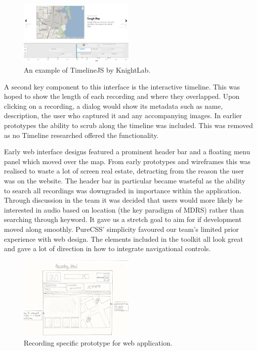 \documentclass{l3proj}
\begin{document}
\begin{figure}[ht!]
\centering
\includegraphics[width=0.5\textwidth]{images/timeline-example.png}
\caption{An example of TimelineJS by KnightLab.}
\end{figure}

A second key component to this interface is the interactive timeline. This was hoped to show the length of each recording and where they overlapped. Upon clicking on a recording, a dialog would show its metadata such as name, description, the user who captured it and any accompanying images. In earlier prototypes the ability to scrub along the timeline was included. This was removed as no Timeline researched offered the functionality.

Early web interface designs featured a prominent header bar and a floating menu panel which moved over the map. From early prototypes and wireframes this was realised to waste a lot of screen real estate, detracting from the reason the user was on the website. The header bar in particular became wasteful as the ability to search all recordings was downgraded in importance within the application. Through discussion in the team it was decided that users would more likely be interested in audio based on location (the key paradigm of MDRS) rather than searching through keyword. It gave us a stretch goal to aim for if development moved along smoothly. PureCSS' simplicity favoured our team's limited prior experience with web design. The elements included in the toolkit all look great and gave a lot of direction in how to integrate navigational controls.

\begin{figure}[ht!]
\centering
\includegraphics[width=0.5\textwidth]{images/web-recording-view.jpg}
\caption{Recording specific prototype for web application.}
\end{figure}
\end{document}
